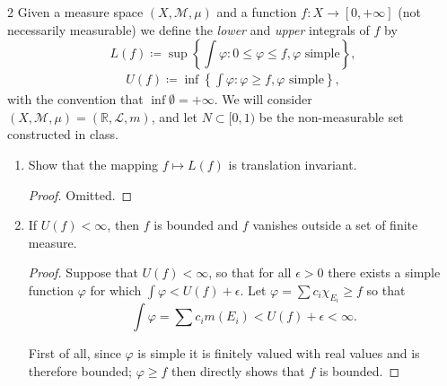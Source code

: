 \documentclass[11pt]{article}
\begin{document}
\begin{problem}{2}
  Given a measure space \( (X, \mathcal{M}, \mu) \) and a function \( f: X \rightarrow [0, +\infty] \) (not necessarily measurable) we define the \textit{lower} and \textit{upper} integrals of \( f \) by
  \begin{equation}
  \label{eq:p2-lower-int}
  L(f) \coloneq \sup\left\{\int \varphi:0\leq \varphi\leq f, \varphi \text{ simple}\right\},
\end{equation}
\begin{equation}
\label{eq:p2-upper-int}
\begin{aligned}
  U(f) \coloneq \inf\left\{\int\varphi: \varphi\geq f, \varphi \text{ simple}\right\},
\end{aligned}
\end{equation}
with the convention that \( \inf \emptyset = +\infty \).
We will consider \( (X, \mathcal{M}, \mu) = (\mathbb{R}, \mathcal{L}, m) \), and let \( N \subset [0,1) \) be the non-measurable set constructed in class.
\begin{enumerate}[label=(\alph*)]
  \item Show that the mapping \( f \mapsto L(f) \) is translation invariant.
        \begin{proof}
          Omitted.
        \end{proof}
  \item If \( U(f) < \infty \), then \( f \) is bounded and \( f \) vanishes outside a set of finite measure.
        \begin{proof}
          Suppose that \( U(f) < \infty \), so that for all \(\epsilon > 0\) there exists a simple function \(\varphi\) for which \( \int \varphi < U(f) + \epsilon \).
          Let \( \varphi = \sum c_i\chi_{E_i} \geq f \) so that
          \begin{equation}
          \label{eq:1}
          \int \varphi = \sum c_i m(E_i) < U(f) + \epsilon < \infty.
        \end{equation}

        First of all, since \(\varphi\) is simple it is finitely valued with real values and is therefore bounded; \( \varphi \geq f \) then directly shows that \( f \) is bounded.


\end{proof}
\end{enumerate}
\end{problem}
\end{document}
